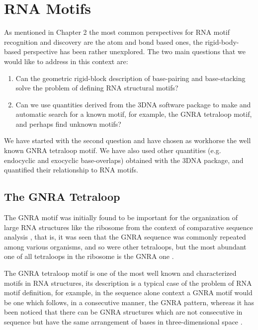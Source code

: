 \chapter{RNA Motifs}
\label{motifs} 

As mentioned in  Chapter 2 the most common  perspectives for RNA motif
recognition  and  discovery are  the  atom  and  bond based  ones, the
rigid-body-based perspective has been  rather unexplored. The two main
questions that we would like to address in this context are:

\begin{enumerate}
\item{Can  the geometric rigid-block  description of  base-pairing and
  base-stacking solve the problem of defining RNA structural motifs?}
\item{Can we use quantities derived  from the 3DNA software package to
  make and automatic  search for a known motif,  for example, the GNRA
  tetraloop motif, and perhaps find unknown motifs?}
\end{enumerate}

We have  started with  the second  question and have  chosen as
workhorse the well known GNRA tetraloop motif. We have also used other
quantities  (e.g.  endocyclic  and  exocyclic base-overlaps)  obtained
with  the 3DNA  \cite{lu2003, lu2008b}  package, and  quantified their
relationship to RNA motifs.

\section{The GNRA Tetraloop}
The  GNRA  motif   was  initially  found  to  be   important  for  the
organization  of  large RNA  structures  like  the  ribosome from  the
context of comparative sequence analysis \cite{woese1990}, that is, it
was seen  that the GNRA  sequence was commonly repeated  among various
organisms, and so were other  tetraloops, but the most abundant one of
all tetraloops in the ribosome is the GNRA one \cite{pardi1991}.


The  GNRA  tetraloop  motif  is   one  of  the  most  well  known  and
characterized motifs in RNA  structures, its description is a typical
case  of the  problem of  RNA motif  definition, for  example,  in the
sequence alone context  a GNRA motif would be one  which follows, in a
consecutive manner, the GNRA pattern, whereas it has been noticed that
there can be GNRA structures which are not consecutive in sequence but
have   the   same    arrangement   of   bases   in   three-dimensional
space \cite{lemieux2006}.






